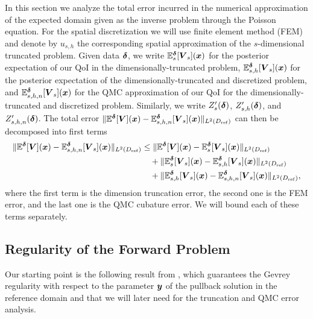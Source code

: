 \documentclass[graybox]{svmult}
\begin{document}
In this section we  analyze the total  error incurred in the numerical approximation of the 
expected domain given as the inverse problem through the Poisson equation. For the spatial discretization we will use finite element method (FEM) and denote by $u_{s,h}$ the corresponding spatial approximation of the $s$-dimensional truncated problem. Given data ${\boldsymbol{\delta}}$, we write $\mathbb{E}_{s}^{{\boldsymbol{\delta}}}[{\boldsymbol{V}}_s]({\boldsymbol{x}})$ for the posterior expectation of our QoI in the dimensionally-truncated problem, $\mathbb{E}_{s,h}^{{\boldsymbol{\delta}}}[{\boldsymbol{V}}_s]({\boldsymbol{x}})$ for the posterior expectation of the dimensionally-truncated and discretized problem, and $\mathbb{E}_{s,h,n}^{{\boldsymbol{\delta}}}[{\boldsymbol{V}}_s]({\boldsymbol{x}})$ 
for the QMC approximation of our QoI for the dimensionally-truncated and discretized problem. Similarly, we write $Z_s'({\boldsymbol{\delta}})$, $Z_{s,h}'({\boldsymbol{\delta}})$, and $Z_{s,h,n}'({\boldsymbol{\delta}})$. The total error $ \| \mathbb{E}^{{\boldsymbol{\delta}}}[{\boldsymbol{V}}]({\boldsymbol{x}}) - \mathbb{E}_{s,h,n}^{{\boldsymbol{\delta}}}[{\boldsymbol{V}}_s]({\boldsymbol{x}}) \|_{L^2(D_{\rm ref})}$ can then be decomposed into first terms  
\begin{align*}
\| \mathbb{E}^{{\boldsymbol{\delta}}}[{\boldsymbol{V}}]({\boldsymbol{x}}) - \mathbb{E}_{s,h,n}^{{\boldsymbol{\delta}}}[{\boldsymbol{V}}_s]({\boldsymbol{x}}) \|_{L^2(D_{\rm ref})} &\leq
{\| \mathbb{E}^{{\boldsymbol{\delta}}}[{\boldsymbol{V}}]({\boldsymbol{x}}) - \mathbb{E}_{s}^{{\boldsymbol{\delta}}}[{\boldsymbol{V}}_s]({\boldsymbol{x}})\|_{L^2(D_{\rm ref})}}
\\
&\quad +{\| \mathbb{E}_{s}^{{\boldsymbol{\delta}}}[{\boldsymbol{V}}_s]({\boldsymbol{x}}) -\mathbb{E}_{s,h}^{{\boldsymbol{\delta}}}[{\boldsymbol{V}}_s]({\boldsymbol{x}})\|_{L^2(D_{\rm ref})}}
\\
&\quad +{\| \mathbb{E}_{s,h}^{{\boldsymbol{\delta}}}[{\boldsymbol{V}}_s]({\boldsymbol{x}}) -\mathbb{E}_{s,h,n}^{{\boldsymbol{\delta}}}[{\boldsymbol{V}}_s]({\boldsymbol{x}}) \|_{L^2(D_{\rm ref})}},
\end{align*}
where the first term is the dimension truncation error, the second one is the FEM error, and the last one is the QMC cubature error. We will bound each of these terms separately. 


\subsection{Regularity of the Forward Problem}

Our starting point is the following result from \cite{djurdjevac24}, which guarantees the Gevrey regularity with respect to the parameter ${\boldsymbol{y}}$ of the pullback solution in the reference domain and that we will later need for the truncation and QMC  error analysis.
\end{document}
